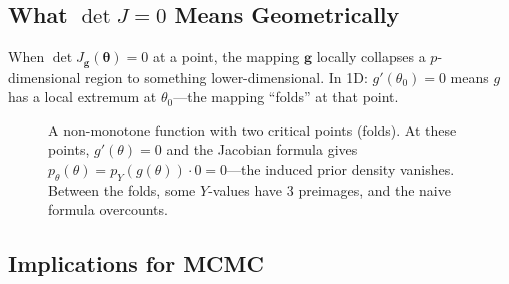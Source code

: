 \documentclass[11pt,a4paper]{article}
\theoremstyle{definition}
\newcommand{\btheta}{\boldsymbol{\theta}}
\begin{document}
\subsection{What \texorpdfstring{$\det J = 0$}{det J = 0} Means Geometrically}

When $\det J_{\mathbf{g}}(\btheta) = 0$ at a point, the mapping $\mathbf{g}$
locally collapses a $p$-dimensional region to something lower-dimensional. In
1D: $g'(\theta_0) = 0$ means $g$ has a local extremum at $\theta_0$---the
mapping ``folds'' at that point.

\begin{figure}[ht]
\centering
{}
\caption{%
    A non-monotone function with two critical points (folds). At these points,
    $g'(\theta) = 0$ and the Jacobian formula gives
    $p_\theta(\theta) = p_Y(g(\theta)) \cdot 0 = 0$---the induced prior
    density vanishes. Between the folds, some $Y$-values have 3 preimages,
    and the naive formula overcounts.
}
\label{fig:folds}
\end{figure}

\subsection{Implications for MCMC}
\end{document}
